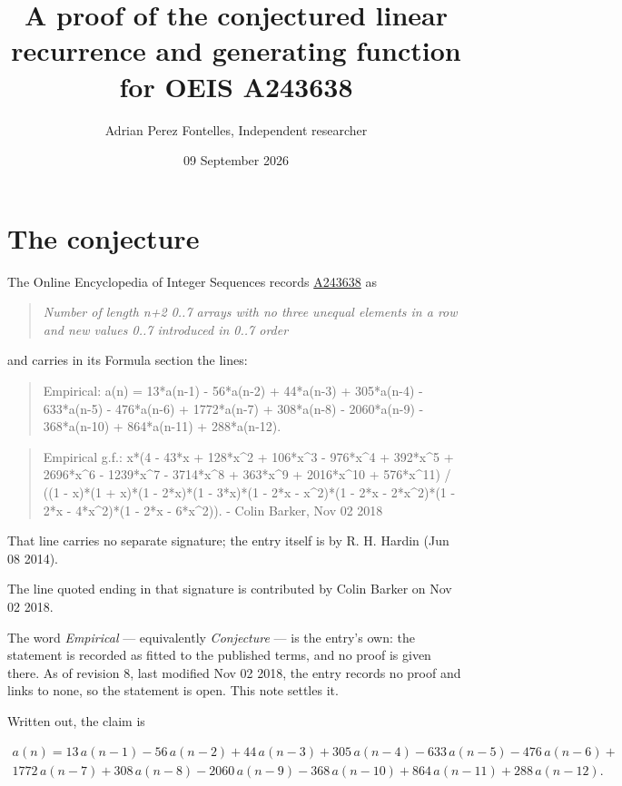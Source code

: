 \documentclass[11pt]{article}
\title{A proof of the conjectured linear recurrence and generating function for OEIS A243638}
\author{Adrian Perez Fontelles, Independent researcher}
\date{09 September 2026}
\theoremstyle{definition}
\begin{document}
\maketitle
\section{The conjecture}

The Online Encyclopedia of Integer Sequences records \href{https://oeis.org/A243638}{A243638} as

\begin{quote}\itshape Number of length n+2 0..7 arrays with no three unequal elements in a row and new values 0..7 introduced in 0..7 order\end{quote}

and carries in its Formula section the lines:

\begin{quote}\ttfamily Empirical: a(n) = 13*a(n-1) - 56*a(n-2) + 44*a(n-3) + 305*a(n-4) - 633*a(n-5) - 476*a(n-6) + 1772*a(n-7) + 308*a(n-8) - 2060*a(n-9) - 368*a(n-10) + 864*a(n-11) + 288*a(n-12).\end{quote}

\begin{quote}\ttfamily Empirical g.f.: x*(4 - 43*x + 128*x\textasciicircum{}2 + 106*x\textasciicircum{}3 - 976*x\textasciicircum{}4 + 392*x\textasciicircum{}5 + 2696*x\textasciicircum{}6 - 1239*x\textasciicircum{}7 - 3714*x\textasciicircum{}8 + 363*x\textasciicircum{}9 + 2016*x\textasciicircum{}10 + 576*x\textasciicircum{}11) / ((1 - x)*(1 + x)*(1 - 2*x)*(1 - 3*x)*(1 - 2*x - x\textasciicircum{}2)*(1 - 2*x - 2*x\textasciicircum{}2)*(1 - 2*x - 4*x\textasciicircum{}2)*(1 - 2*x - 6*x\textasciicircum{}2)). - Colin Barker, Nov 02 2018\end{quote}

That line carries no separate signature; the entry itself is by R. H. Hardin (Jun 08 2014).

The line quoted ending in that signature is contributed by Colin Barker on Nov 02 2018.

The word {\itshape Empirical} --- equivalently {\itshape Conjecture} --- is the entry's own: the statement is recorded as fitted to the published terms, and no proof is given there. As of revision 8, last modified Nov 02 2018, the entry records no proof and links to none, so the statement is open. This note settles it.

Written out, the claim is

\begin{multline*} a(n) = 13\,a(n-1) - 56\,a(n-2) + 44\,a(n-3) + 305\,a(n-4) - 633\,a(n-5) - 476\,a(n-6) + \\ 1772\,a(n-7) + 308\,a(n-8) - 2060\,a(n-9) - 368\,a(n-10) + 864\,a(n-11) + 288\,a(n-12). \end{multline*}
\end{document}
